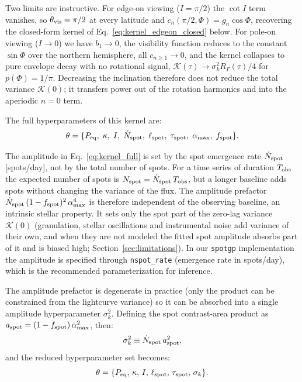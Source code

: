 \documentclass[preprint]{aastex702}
\newcommand{\code}[1]{{\texttt{#1}}}
\begin{document}
Two limits are instructive. For edge-on viewing ($I = \pi/2$) the $\cot I$ term vanishes, so $\theta_{\rm vis} = \pi/2$ at every latitude and $c_n(\pi/2,\Phi) = g_n\cos\Phi$, recovering the closed-form kernel of Eq.~\eqref{eq:kernel_edgeon_closed} below. For pole-on viewing ($I \to 0$) we have $b_1 \to 0$, the visibility function reduces to the constant $\sin\Phi$ over the northern hemisphere, all $c_{n \geq 1} \to 0$, and the kernel collapses to pure envelope decay with no rotational signal, $\mathcal{K}(\tau) \to \sigma_k^2 R_\Gamma(\tau)/4$ for $p(\Phi) = 1/\pi$. Decreasing the inclination therefore does not reduce the total variance $\mathcal{K}(0)$; it transfers power out of the rotation harmonics and into the aperiodic $n = 0$ term.

The full hyperparameters of this kernel are:
\begin{equation}
    \theta = \{ P_{\rm eq},\; \kappa,\; I,\; \dot{N}_{\rm spot},\; \ell_{\rm spot},\; \tau_{\rm spot},\; \alpha_{\rm max},\; f_{\rm spot} \}.
\end{equation}

The amplitude in Eq.~\eqref{eq:kernel_full} is set by the spot emergence rate $\dot{N}_{\rm spot}$ [spots/day], not by the total number of spots. For a time series of duration $T_{\rm obs}$ the expected number of spots is $N_{\rm spot} = \dot{N}_{\rm spot}\,T_{\rm obs}$, but a longer baseline adds spots without changing the variance of the flux. The amplitude prefactor $\dot{N}_{\rm spot}\,(1 - f_{\rm spot})^2\,\alpha_{\max}^4$ is therefore independent of the observing baseline, an intrinsic stellar property. It sets only the spot part of the zero-lag variance $\mathcal{K}(0)$ (granulation, stellar oscillations and instrumental noise add variance of their own, and when they are not modeled the fitted spot amplitude absorbs part of it and is biased high; Section~\ref{sec:limitations}). In our \code{spotgp} implementation the amplitude is specified through \texttt{nspot\_rate} (emergence rate in spots/day), which is the recommended parameterization for inference.

The amplitude prefactor is degenerate in practice (only the product can be constrained from the lightcurve variance) so it can be absorbed into a single amplitude hyperparameter $\sigma_k^2$. Defining the spot contrast-area product as $a_{\rm spot} = (1 - f_{\rm spot})\,\alpha_{\max}^2$, then:
\begin{equation}
    \sigma_k^2 \equiv \dot{N}_{\rm spot}\,a_{\rm spot}^2,
    \label{eq:sigma_k_cspot}
\end{equation}
and the reduced hyperparameter set becomes:
\begin{equation}
    \theta = \{ P_{\rm eq},\, \kappa,\, I,\, \ell_{\rm spot},\, \tau_{\rm spot},\, \sigma_k \}.
\end{equation}
\end{document}
